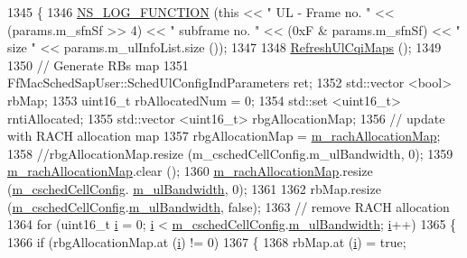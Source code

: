 \begin{DoxyCode}
1345 \{
1346   \hyperlink{log-macros-disabled_8h_a90b90d5bad1f39cb1b64923ea94c0761}{NS\_LOG\_FUNCTION} (\textcolor{keyword}{this} << \textcolor{stringliteral}{" UL - Frame no. "} << (params.m\_sfnSf >> 4) << \textcolor{stringliteral}{" subframe no. "} 
      << (0xF & params.m\_sfnSf) << \textcolor{stringliteral}{" size "} << params.m\_ulInfoList.size ());
1347 
1348   \hyperlink{classns3_1_1TdBetFfMacScheduler_ad78d0be66210e23e11005edecf4f145e}{RefreshUlCqiMaps} ();
1349 
1350   \textcolor{comment}{// Generate RBs map}
1351   FfMacSchedSapUser::SchedUlConfigIndParameters ret;
1352   std::vector <bool> rbMap;
1353   uint16\_t rbAllocatedNum = 0;
1354   std::set <uint16\_t> rntiAllocated;
1355   std::vector <uint16\_t> rbgAllocationMap;
1356   \textcolor{comment}{// update with RACH allocation map}
1357   rbgAllocationMap = \hyperlink{classns3_1_1TdBetFfMacScheduler_a985948ee40a0d721009dea792474ee51}{m\_rachAllocationMap};
1358   \textcolor{comment}{//rbgAllocationMap.resize (m\_cschedCellConfig.m\_ulBandwidth, 0);}
1359   \hyperlink{classns3_1_1TdBetFfMacScheduler_a985948ee40a0d721009dea792474ee51}{m\_rachAllocationMap}.clear ();
1360   \hyperlink{classns3_1_1TdBetFfMacScheduler_a985948ee40a0d721009dea792474ee51}{m\_rachAllocationMap}.resize (\hyperlink{classns3_1_1TdBetFfMacScheduler_a3e53aae0259501332769cd6ca4b74800}{m\_cschedCellConfig}.
      \hyperlink{structns3_1_1FfMacCschedSapProvider_1_1CschedCellConfigReqParameters_a5ab5b102878e6e7e7727a14af4a64d2f}{m\_ulBandwidth}, 0);
1361 
1362   rbMap.resize (\hyperlink{classns3_1_1TdBetFfMacScheduler_a3e53aae0259501332769cd6ca4b74800}{m\_cschedCellConfig}.\hyperlink{structns3_1_1FfMacCschedSapProvider_1_1CschedCellConfigReqParameters_a5ab5b102878e6e7e7727a14af4a64d2f}{m\_ulBandwidth}, \textcolor{keyword}{false});
1363   \textcolor{comment}{// remove RACH allocation}
1364   \textcolor{keywordflow}{for} (uint16\_t \hyperlink{bernuolliDistribution_8m_a6f6ccfcf58b31cb6412107d9d5281426}{i} = 0; \hyperlink{bernuolliDistribution_8m_a6f6ccfcf58b31cb6412107d9d5281426}{i} < \hyperlink{classns3_1_1TdBetFfMacScheduler_a3e53aae0259501332769cd6ca4b74800}{m\_cschedCellConfig}.\hyperlink{structns3_1_1FfMacCschedSapProvider_1_1CschedCellConfigReqParameters_a5ab5b102878e6e7e7727a14af4a64d2f}{m\_ulBandwidth}; 
      \hyperlink{bernuolliDistribution_8m_a6f6ccfcf58b31cb6412107d9d5281426}{i}++)
1365     \{
1366       \textcolor{keywordflow}{if} (rbgAllocationMap.at (\hyperlink{bernuolliDistribution_8m_a6f6ccfcf58b31cb6412107d9d5281426}{i}) != 0)
1367         \{
1368           rbMap.at (\hyperlink{bernuolliDistribution_8m_a6f6ccfcf58b31cb6412107d9d5281426}{i}) = \textcolor{keyword}{true};

\end{DoxyCode}
